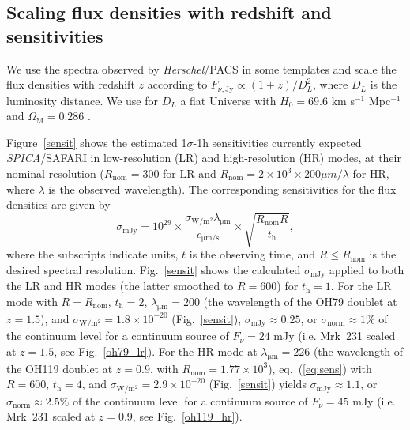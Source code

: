\documentclass{pasa}%
\begin{document}
\begin{appendix}

\section{Scaling flux densities with redshift and sensitivities}
\label{appa}

We use the spectra observed by {\it Herschel}/PACS in some templates
and scale the flux densities with redshift $z$ according to
$F_{\nu,\mathrm{Jy}}\propto (1+z) / D_L^2$, where $D_L$ is the luminosity
distance. We use for $D_L$ a flat Universe with 
$H_0=69.6$ km s$^{-1}$ Mpc$^{-1}$ and $\Omega_{\mathrm{M}}=0.286$ \citep{ben14}. 

Figure~\ref{sensit} shows the estimated 1$\sigma$-1h sensitivities currently
expected {\it SPICA}/SAFARI \citep{spi17,gru17} in low-resolution (LR) and
high-resolution (HR) modes, at their nominal resolution 
($R_{\mathrm{nom}}=300$ for LR and 
$R_{\mathrm{nom}}=2\times10^3\times200\mu m/\lambda$ 
for HR, where $\lambda$ is the observed wavelength). The corresponding
sensitivities for the flux densities are given by
\begin{equation}
\sigma_{\mathrm{mJy}} = 10^{29} \times
\frac{\sigma_{\mathrm{W/m^2}}\lambda_{\mathrm{\mu m}}}{c_{\mathrm{\mu m/s}}} 
 \times \sqrt{\frac{R_{\mathrm{nom}}R}{t_{\mathrm{h}}}},
\label{eq:sens}
\end{equation}
where the subscripts indicate units, $t$ is the observing time, and 
$R\leq R_{\mathrm{nom}}$ is the desired spectral resolution. Fig.~\ref{sensit} 
shows the calculated $\sigma_{\mathrm{mJy}}$ applied to both the LR and HR
modes (the latter smoothed to $R=600$) for $t_{\mathrm{h}}=1$. 
For the LR mode with $R=R_{\mathrm{nom}}$, $t_{\mathrm{h}}=2$, 
$\lambda_{\mathrm{\mu m}}=200$ (the wavelength of the OH79 doublet at $z=1.5$),
and $\sigma_{\mathrm{W/m^2}}=1.8\times10^{-20}$ (Fig.~\ref{sensit}),
$\sigma_{\mathrm{mJy}}\approx0.25$, or $\sigma_{\mathrm{norm}}\approx1$\% of
the continuum level for a continuum source of $F_{\nu}=24$ mJy (i.e. Mrk~231
scaled at $z=1.5$, see Fig.~\ref{oh79_lr}).
For the HR mode at $\lambda_{\mathrm{\mu m}}=226$
(the wavelength of the OH119 doublet at $z=0.9$, with
$R_{\mathrm{nom}}=1.77\times10^3$), eq.~(\ref{eq:sens}) with 
$R=600$, $t_{\mathrm{h}}=4$, and $\sigma_{\mathrm{W/m^2}}=2.9\times10^{-20}$
(Fig.~\ref{sensit}) yields $\sigma_{\mathrm{mJy}}\approx1.1$, or
$\sigma_{\mathrm{norm}}\approx2.5$\% of the continuum level for a continuum
source of $F_{\nu}=45$ mJy (i.e. Mrk~231 
scaled at $z=0.9$, see Fig.~\ref{oh119_hr}).


\end{appendix}
\end{document}
